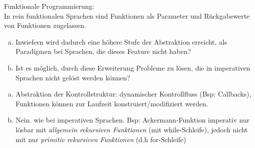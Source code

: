 \begin{card}
	Funktionale Programmierung:\\
	In rein funktionalen Sprachen sind Funktionen als Parameter und Rückgabewerte von Funktionen zugelassen.
	\begin{enumerate}[a)]
	\item  Inwiefern wird dadurch eine höhere Stufe der Abstraktion erreicht, als Paradigmen bei Sprachen, die dieses Feature nicht haben?
	\item Ist es möglich, durch diese Erweiterung Probleme zu lösen, die in imperativen Sprachen nicht gelöst werden können?
	\end{enumerate}
	\hr
	\begin{enumerate}[a)]
	\item Abstraktion der Kontrollstruktur: dynamischer Kontrollfluss (Bsp: Callbacks), Funktionen können zur Laufzeit konstruiert/modifiziert werden.
	\item  Nein. wie bei imperativen Sprachen. 
	Bsp: Ackermann-Funktion imperativ nur lösbar mit \textit{allgemein rekursiven Funktionen} (mit while-Schleife), jedoch nicht mit nur \textit{primitiv rekursiven Funktionen} (d.h for-Schleife)
	\end{enumerate}
\end{card}
